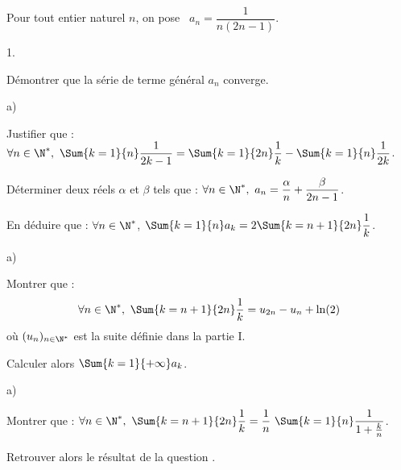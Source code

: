 \noindent
Pour tout entier naturel $n$, on pose \ $a_{n} = \dfrac1{n(2n-1)}$.
\begin{noliste}{1.}
  \setlength{\itemsep}{4mm}
\item Démontrer que la série de terme général $a_{n}$ converge.

  

\item
  \begin{noliste}{a)} 
    \setlength{\itemsep}{2mm}
  \item Justifier que : $\forall n \in \N^*, \ \Sum{k = 1}{n}
    \dfrac{1}{2k-1} = \Sum{k = 1}{2n} \dfrac{1}{k} - \Sum{k = 1}{n}
    \dfrac{1}{2k}$.
    
    

  \item Déterminer deux réels $\alpha$ et $\beta$ tels que : $\forall
    n \in \N^*, \ a_{n} = \dfrac{\alpha}{n} + \dfrac{\beta}{2n-1}$.

    

  \item En déduire que : $\forall n \in \N^*$, $\Sum{k = 1}{n} a_{k} =
    2 \Sum{k = n + 1}{2n} \dfrac{1}{k}$.

    
  \end{noliste}




\item 
  \begin{noliste}{a)}
    \setlength{\itemsep}{2mm}
  \item Montrer que : 
    \[
    \forall n \in \N^*, \ \Sum{k = n + 1}{2n} \dfrac{1}{k} =
    u_{2n}-u_{n} + \ln(2)
    \]
    où $(u_{n})_{n \in \N^*}$ est la suite définie dans la partie I.

    

  \item Calculer alors  $\Sum{k = 1}{+ \infty} a_{k}$.
    
    
  \end{noliste}

\item 
  \begin{noliste}{a)}
    \setlength{\itemsep}{2mm}
  \item Montrer que : $\forall n \in \N^*, \ \Sum{k = n + 1}{2n}
    \dfrac{1}{k} = \dfrac{1}{n} \ \Sum{k = 1}{n} \dfrac{1}{1 +
      \frac{k}{n}}$.

    




  \item Retrouver alors le résultat de la question .

    

  \end{noliste}
\end{noliste}

